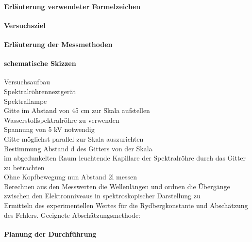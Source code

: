 \documentclass[12pt,oneside,oldfontcommands]{memoir}
\begin{document}
\paragraph{Erläuterung verwendeter Formelzeichen}
\paragraph{Versuchsziel}



\paragraph{Erläuterung der Messmethoden}
\paragraph{schematische Skizzen}
Versuchsaufbau\\

Spektralröhrenneztgerät\\
Spektrallampe\\

Gitte im Abstand von 45 cm zur Skala aufstellen\\

Wasserstoffspektralröhre zu verwenden\\

Spannung von 5 kV notwendig \\

Gitte möglichst parallel zur Skala auszurichten\\

Bestimmung Abstand d des Gitters von der Skala\\

im abgedunkelten Raum leuchtende Kapillare der Spektralröhre durch das Gitter zu betrachten\\

Ohne Kopfbewegung nun Abstand 2l messen\\

Berechnen aus den Messwerten die Wellenlängen und ordnen die Übergänge zwischen den Elektronniveaus in spektroskopischer Darstellung zu\\

Ermitteln des experimentellen Wertes für die Rydbergkonstante und Abschätzung des Fehlers. Geeignete Abschätzungsmethode:\\


\paragraph{Planung der Durchführung}
\end{document}
